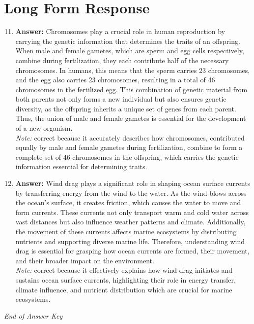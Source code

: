 \documentclass[12pt]{article}
\begin{document}
\section*{Long Form Response}
\begin{enumerate}[label=\arabic*.]
\setcounter{enumi}{10}
\item \textbf{Answer:} Chromosomes play a crucial role in human reproduction by carrying the genetic information that determines the traits of an offspring. When male and female gametes, which are sperm and egg cells respectively, combine during fertilization, they each contribute half of the necessary chromosomes. In humans, this means that the sperm carries 23 chromosomes, and the egg also carries 23 chromosomes, resulting in a total of 46 chromosomes in the fertilized egg. This combination of genetic material from both parents not only forms a new individual but also ensures genetic diversity, as the offspring inherits a unique set of genes from each parent. Thus, the union of male and female gametes is essential for the development of a new organism.
\\ \textit{Note:} correct because it accurately describes how chromosomes, contributed equally by male and female gametes during fertilization, combine to form a complete set of 46 chromosomes in the offspring, which carries the genetic information essential for determining traits.
\item \textbf{Answer:} Wind drag plays a significant role in shaping ocean surface currents by transferring energy from the wind to the water. As the wind blows across the ocean's surface, it creates friction, which causes the water to move and form currents. These currents not only transport warm and cold water across vast distances but also influence weather patterns and climate. Additionally, the movement of these currents affects marine ecosystems by distributing nutrients and supporting diverse marine life. Therefore, understanding wind drag is essential for grasping how ocean currents are formed, their movement, and their broader impact on the environment.
\\ \textit{Note:} correct because it effectively explains how wind drag initiates and sustains ocean surface currents, highlighting their role in energy transfer, climate influence, and nutrient distribution which are crucial for marine ecosystems.
\end{enumerate}

\vfill
\noindent\textit{End of Answer Key}
\end{document}
